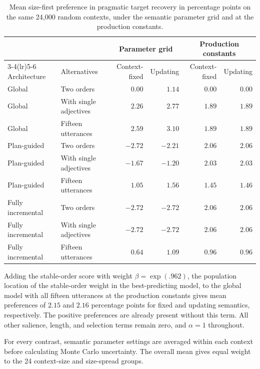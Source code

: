 \documentclass[10pt,a4paper,fleqn]{article}
\begin{document}
\begin{table}[H]
  \centering
  \caption{Mean size-first preference in pragmatic target recovery in percentage points on the same 24{,}000 random contexts, under the semantic parameter grid and at the production constants.}
  \label{tab:controlled-simulation-means}
  \footnotesize
  \begin{tabularx}{\textwidth}{lXrrrr}
    \toprule
    & & \multicolumn{2}{c}{Parameter grid} & \multicolumn{2}{c}{Production constants} \\
    \cmidrule(lr){3-4}\cmidrule(lr){5-6}
    Architecture & Alternatives & Context-fixed & Updating & Context-fixed & Updating \\
    \midrule
    Global & Two orders & $0.00$ & $1.14$ & $0.00$ & $0.00$ \\
    Global & With single adjectives & $2.26$ & $2.77$ & $1.89$ & $1.89$ \\
    Global & Fifteen utterances & $2.59$ & $3.10$ & $1.89$ & $1.89$ \\
    \addlinespace
    Plan-guided & Two orders & $-2.72$ & $-2.21$ & $2.06$ & $2.06$ \\
    Plan-guided & With single adjectives & $-1.67$ & $-1.20$ & $2.03$ & $2.03$ \\
    Plan-guided & Fifteen utterances & $1.05$ & $1.56$ & $1.45$ & $1.46$ \\
    \addlinespace
    Fully incremental & Two orders & $-2.72$ & $-2.72$ & $2.06$ & $2.06$ \\
    Fully incremental & With single adjectives & $-2.72$ & $-2.72$ & $2.06$ & $2.06$ \\
    Fully incremental & Fifteen utterances & $0.64$ & $1.09$ & $0.96$ & $0.96$ \\
    \bottomrule
  \end{tabularx}
\end{table}

Adding the stable-order score with weight $\beta=\exp(.962)$, the population location of the stable-order weight in the best-predicting model, to the global model with all fifteen utterances at the production constants gives mean preferences of $2.15$ and $2.16$ percentage points for fixed and updating semantics, respectively.
The positive preferences are already present without this term.
All other salience, length, and selection terms remain zero, and $\alpha=1$ throughout.

For every contrast, semantic parameter settings are averaged within each context before calculating Monte Carlo uncertainty.
The overall mean gives equal weight to the 24 context-size and size-spread groups.
\end{document}
